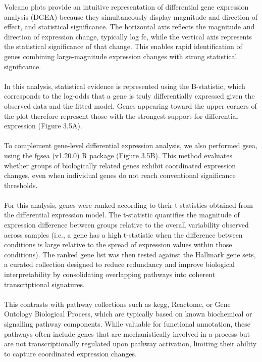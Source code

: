Volcano plots provide an intuitive representation of differential gene expression analysis (DGEA) because they simultaneously display magnitude and direction of effect, and statistical significance. The horizontal axis reflects the magnitude and direction of expression change, typically log \gls{fc}, while the vertical axis represents the statistical significance of that change. This enables rapid identification of genes combining large-magnitude expression changes with strong statistical significance.
\\
\\
In this analysis, statistical evidence is represented using the B-statistic, which corresponds to the log-odds that a gene is truly differentially expressed given the observed data and the fitted model. Genes appearing toward the upper corners of the plot therefore represent those with the strongest support for differential expression (Figure 3.5A).
\\
\\
To complement gene-level differential expression analysis, we also performed \gls{gsea}\cite{subramanian_gene_2005}, using the fgsea (v1.20.0)\cite{korotkevich_fast_2016} R package (Figure 3.5B). This method evaluates whether groups of biologically related genes exhibit coordinated expression changes, even when individual genes do not reach conventional significance thresholds.
\\
\\
For this analysis, genes were ranked according to their t-statistics obtained from the differential expression model. The t-statistic quantifies the magnitude of expression difference between groups relative to the overall variability observed across samples (i.e., a gene has a high t-statistic when the difference between conditions is large relative to the spread of expression values within those conditions). The ranked gene list was then tested against the Hallmark gene sets, a curated collection designed to reduce redundancy and improve biological interpretability by consolidating overlapping pathways into coherent transcriptional signatures\cite{liberzon_molecular_2015}.
\\
\\
This contrasts with pathway collections such as \gls{kegg}\cite{kanehisa_kegg_2000}, Reactome\cite{croft_reactome_2011}, or Gene Ontology Biological Process\cite{ashburner_gene_2000}, which are typically based on known biochemical or signalling pathway components. While valuable for functional annotation, these pathways often include genes that are mechanistically involved in a process but are not transcriptionally regulated upon pathway activation, limiting their ability to capture coordinated expression changes.

